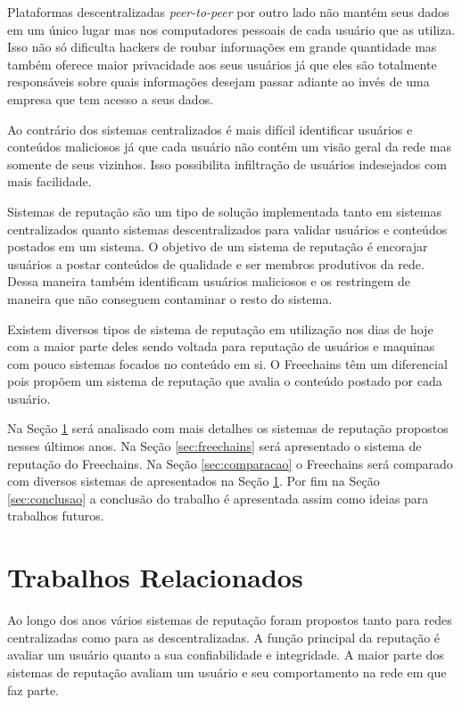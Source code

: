 \documentclass[12pt]{article}
\newcommand{\FC} {Freechains\xspace}
\newcommand{\PtoP} {\emph{peer-to-peer}\xspace}
\begin{document}
Plataformas descentralizadas \PtoP por outro lado não mantém seus dados em um único lugar mas nos computadores pessoais de cada usuário que as utiliza. Isso não só dificulta hackers de roubar informações em grande quantidade mas também oferece maior privacidade aos seus usuários já que eles são totalmente responsáveis sobre quais informações desejam passar adiante ao invés de uma empresa que tem acesso a seus dados.

Ao contrário dos sistemas centralizados é mais difícil identificar usuários e conteúdos maliciosos já que cada usuário não contém um visão geral da rede mas somente de seus vizinhos. Isso possibilita  infiltração de usuários indesejados com mais facilidade. 

Sistemas de reputação são um tipo de solução implementada tanto em sistemas centralizados quanto sistemas descentralizados para validar usuários e conteúdos postados em um sistema. O objetivo de um sistema de reputação é encorajar usuários a postar conteúdos de qualidade e ser membros produtivos da rede. Dessa maneira também identificam usuários maliciosos e os restringem de maneira que não conseguem contaminar o resto do sistema.

Existem diversos tipos de sistema de reputação em utilização nos dias de hoje com a maior parte deles sendo voltada para reputação de usuários e maquinas com pouco sistemas focados no conteúdo em si. O \FC têm um diferencial pois propõem um sistema de reputação que avalia o conteúdo postado por cada usuário. 

Na Seção \ref{sec:trabrec} será analisado com mais detalhes os sistemas de reputação propostos nesses últimos anos. Na Seção \ref{sec:freechains} será apresentado o sistema de reputação do \FC. Na Seção \ref{sec:comparacao} o \FC será comparado com diversos sistemas de apresentados na Seção \ref{sec:trabrec}. Por fim na Seção \ref{sec:conclusao} a conclusão do trabalho é apresentada assim como ideias para trabalhos futuros.

\section{Trabalhos Relacionados} \label{sec:trabrec}

Ao longo dos anos vários sistemas de reputação foram propostos tanto para redes centralizadas como para as descentralizadas. A função principal da reputação é avaliar um usuário quanto a sua confiabilidade e integridade. A maior parte dos sistemas de reputação avaliam um usuário e seu comportamento na rede em que faz parte. 
\end{document}
